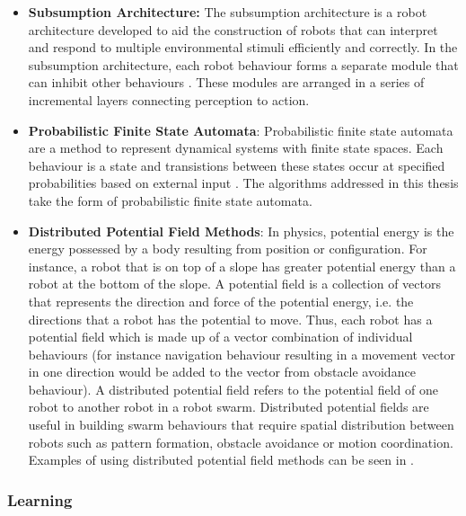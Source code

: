 \begin{itemize}
	\item \textbf{Subsumption Architecture:} The subsumption architecture is a robot architecture developed to aid the construction of robots that can interpret and respond to multiple environmental stimuli efficiently and correctly. In the subsumption architecture, each robot behaviour forms a separate module that can inhibit other behaviours \cite{connell1989colony}. These modules are arranged in a series of incremental layers connecting perception to action. 
	
	\item \textbf{Probabilistic Finite State Automata}: Probabilistic finite state automata are a method to represent dynamical systems with finite state spaces. Each behaviour is a state and transistions between these states occur at specified probabilities based on external input \cite{labella2004efficiency, soysal2005probabilistic}. The algorithms addressed in this thesis take the form of probabilistic finite state automata.  
	
	\item \textbf{Distributed Potential Field Methods}: In physics, potential energy is the energy possessed by a body resulting from position or configuration. For instance, a robot that is on top of a slope has greater potential energy than a robot at the bottom of the slope. A potential field is a collection of vectors that represents the direction and force of the potential energy, i.e. the directions that a robot has the potential to move. Thus, each robot has a potential field which is made up of a vector combination of individual behaviours (for instance navigation behaviour resulting in a movement vector in one direction would be added to the vector from obstacle avoidance behaviour). A distributed potential field refers to the potential field of one robot to another robot in a robot swarm. Distributed potential fields are useful in building swarm behaviours that require spatial distribution between robots such as pattern formation, obstacle avoidance or motion coordination. Examples of using distributed potential field methods can be seen in \cite{bennet2010distributed, barnes2007unmanned, kim2006decentralized}.
\end{itemize}

\subsubsection{Learning}

